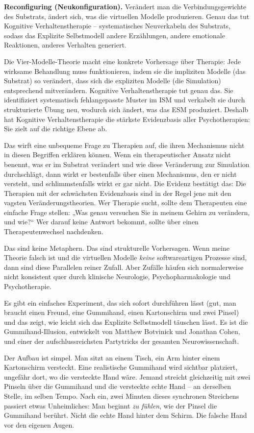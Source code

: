 \documentclass[11pt, twoside, openright]{book}
\begin{document}
\textbf{Reconfiguring (Neukonfiguration).} Verändert man die Verbindungsgewichte des Substrats, ändert sich, was die virtuellen Modelle produzieren. Genau das tut Kognitive Verhaltenstherapie -- systematisches Neuverkabeln des Substrats, sodass das Explizite Selbstmodell andere Erzählungen, andere emotionale Reaktionen, anderes Verhalten generiert.

Die Vier-Modelle-Theorie macht eine konkrete Vorhersage über Therapie: Jede wirksame Behandlung muss funktionieren, indem sie die impliziten Modelle (das Substrat) so verändert, dass sich die expliziten Modelle (die Simulation) entsprechend mitverändern. Kognitive Verhaltenstherapie tut genau das. Sie identifiziert systematisch fehlangepasste Muster im ISM und verkabelt sie durch strukturierte Übung neu, wodurch sich ändert, was das ESM produziert. Deshalb hat Kognitive Verhaltenstherapie die stärkste Evidenzbasis aller Psychotherapien: Sie zielt auf die richtige Ebene ab.

Das wirft eine unbequeme Frage zu Therapien auf, die ihren Mechanismus nicht in diesen Begriffen erklären können. Wenn ein therapeutischer Ansatz nicht benennt, was er im Substrat verändert und wie diese Veränderung zur Simulation durchschlägt, dann wirkt er bestenfalls über einen Mechanismus, den er nicht versteht, und schlimmstenfalls wirkt er gar nicht. Die Evidenz bestätigt das: Die Therapien mit der schwächsten Evidenzbasis sind in der Regel jene mit den vagsten Veränderungstheorien. Wer Therapie sucht, sollte dem Therapeuten eine einfache Frage stellen: „Was genau versuchen Sie in meinem Gehirn zu verändern, und wie?“ Wer darauf keine Antwort bekommt, sollte über einen Therapeutenwechsel nachdenken.

Das sind keine Metaphern. Das sind strukturelle Vorhersagen. Wenn meine Theorie falsch ist und die virtuellen Modelle \textit{keine} softwareartigen Prozesse sind, dann sind diese Parallelen reiner Zufall. Aber Zufälle häufen sich normalerweise nicht konsistent quer durch klinische Neurologie, Psychopharmakologie und Psychotherapie.

Es gibt ein einfaches Experiment, das sich sofort durchführen lässt (gut, man braucht einen Freund, eine Gummihand, einen Kartonschirm und zwei Pinsel) und das zeigt, wie leicht sich das Explizite Selbstmodell täuschen lässt. Es ist die Gummihand-Illusion, entwickelt von Matthew Botvinick und Jonathan Cohen, und einer der aufschlussreichsten Partytricks der gesamten Neurowissenschaft.

Der Aufbau ist simpel. Man sitzt an einem Tisch, ein Arm hinter einem Kartonschirm versteckt. Eine realistische Gummihand wird sichtbar platziert, ungefähr dort, wo die versteckte Hand wäre. Jemand streicht gleichzeitig mit zwei Pinseln über die Gummihand und die versteckte echte Hand -- an derselben Stelle, im selben Tempo. Nach ein, zwei Minuten dieses synchronen Streichens passiert etwas Unheimliches: Man beginnt \textit{zu fühlen}, wie der Pinsel die Gummihand berührt. Nicht die echte Hand hinter dem Schirm. Die falsche Hand vor den eigenen Augen.
\end{document}
